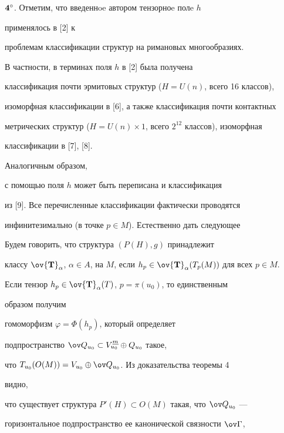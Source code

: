 $\bold 4^\circ$. Отметим, что введеннoe автором тензорноe полe $h$


применялось в [2] к 


проблемам классификации структур на римановых многообразиях. 


В частности, в терминах поля $h$ в [2] была получена 


классификация почти эрмитовых структур ($H=U(n)$, всего 16 классов), 


изоморфная классификации в [6], а также классификация почти контактных 


метрических структур ($H=U(n)\times1$, всего $2^{12}$ классов), изоморфная 


классификации в [7], [8]. 


 


Аналогичным образом,


с помощью поля $h$ может быть переписана и классификация 


из [9]. Все перечисленные классификации фактически проводятся 


инфинитезимально (в точке $p\in M$). Естественно дать следующее 


 


\begin{defn} 


Будем говорить, что структура $(P(H),g)$ принадлежит 


классу $\ov{\bold T}_\alpha$, $\alpha\in A$, на $M$, если $h_p\in\ov{\bold 


T}_\alpha(T_p(M))$ для всех $p\in M$. 


\end{defn} 


 


Если тензор $h_p\in\ov{\bold T}_\alpha(T)$, $p=\pi(u_0)$, то единственным 


образом получим 


гомоморфизм $\varphi=\Phi(h_p)$, который определяет 


подпространство $\ov Q_{u_0}\subset V^{\ul m}_{u_0}\oplus Q_{u_0}$ такое, 


что $T_{u_0}(O(M))=V_{u_0}\oplus\ov Q_{u_0}$. Из доказательства теоремы 4


видно, 


что существует структура $P'(H)\subset O(M)$ такая, что $\ov Q_{u_0}$ --- 


горизонтальное подпространство ее канонической связности $\ov\Gamma$, 


